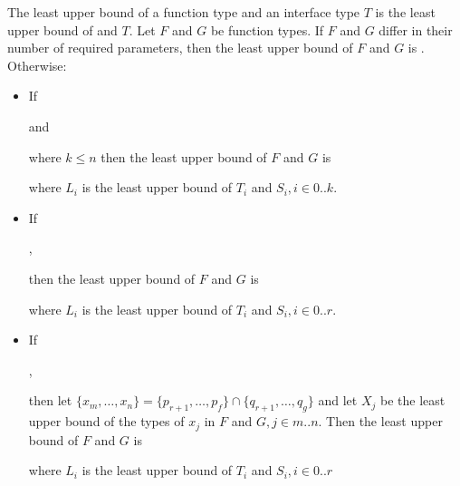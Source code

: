 \documentclass{article}
\begin{document}
\LMHash{}
The least upper bound of a function type and an interface type $T$ is the least upper bound of \FUNCTION{} and $T$.
Let $F$ and $G$ be function types.
If $F$ and $G$ differ in their number of required parameters,
then the least upper bound of $F$ and $G$ is \FUNCTION{}.
Otherwise:
\begin{itemize}
\item If

 and


\noindent
where $k \le n$ then the least upper bound of $F$ and $G$ is


\noindent
where $L_i$ is the least upper bound of $T_i$ and $S_i, i \in 0 .. k$.
\item If

,


\noindent
then the least upper bound of $F$ and $G$ is


\noindent
where $L_i$ is the least upper bound of $T_i$ and $S_i, i \in 0 .. r$.
\item If

,


then let
$\{x_m, \ldots, x_n\} = \{p_{r+1}, \ldots, p_f\} \cap \{q_{r+1}, \ldots, q_g\}$
and let $X_j$ be the least upper bound of the types of $x_j$ in $F$ and
$G, j \in m .. n$.
Then the least upper bound of $F$ and $G$ is


where $L_i$ is the least upper bound of $T_i$ and $S_i, i \in 0 .. r$
\end{itemize}
\end{document}

